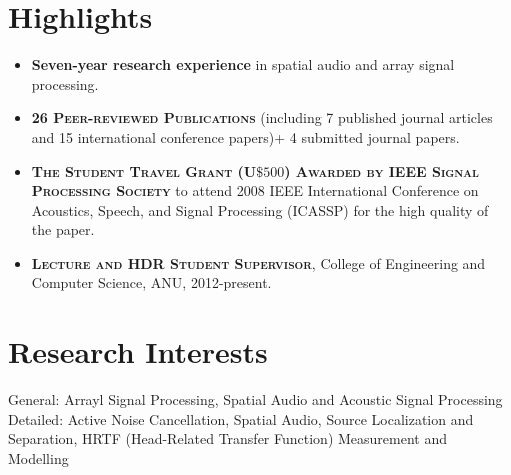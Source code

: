 \documentclass[11pt]{article}
\begin{document}
\section*{Highlights}
%
\begin{itemize}
%
\item \textbf{Seven-year research experience} in spatial audio and array signal processing.

\item \textsc{\textbf{26 Peer-reviewed Publications}} (including 7 published journal articles and 15 international conference papers)+ 4 submitted journal papers.

\item \textsc{\textbf{The Student Travel Grant (U$\$500$) Awarded by IEEE Signal Processing Society}} to attend 2008
IEEE International Conference on Acoustics, Speech, and Signal Processing (ICASSP) for the high quality of the paper.


\item \textsc{\textbf{Lecture and HDR Student Supervisor}}, College of Engineering and Computer Science, ANU, 2012-present.
%
\end{itemize}

\section*{Research Interests}
General: Arrayl Signal Processing, Spatial Audio and Acoustic Signal Processing\\
Detailed: Active Noise Cancellation, Spatial Audio, Source Localization and Separation, HRTF (Head-Related Transfer Function) Measurement and Modelling

%
\end{document}
